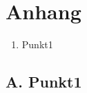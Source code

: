 \chapter{Anhang}

{\Large
\begin{enumerate}[label=\Alph*]
	\item Punkt1
\end{enumerate}
}
\pagebreak
\section*{A. Punkt1}

